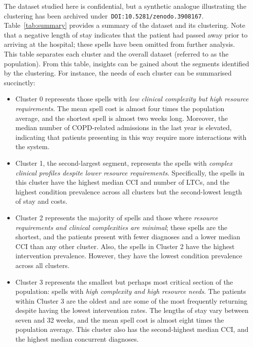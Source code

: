 \documentclass[]{interact}
\theoremstyle{plain}%
\theoremstyle{definition}
\theoremstyle{remark}
\begin{document}
\begin{table}
    \centering
    \resizebox{\textwidth}{!}{}
    \caption{%
        A summary of clinical and condition-specific characteristics for each
        cluster and the population
    }
    \label{tab:summary}
\end{table}

The dataset studied here is confidential, but a synthetic analogue illustrating
the clustering has been archived under~\texttt{DOI:10.5281/zenodo.3908167}.
Table~\ref{tab:summary} provides a summary of the dataset and its clustering.
Note that a negative length of stay indicates that the patient had passed away
prior to arriving at the hospital; these spells have been omitted from further
analysis. This table separates each cluster and the overall dataset (referred to
as the population). From this table, insights can be gained about the segments
identified by the clustering. For instance, the needs of each cluster can be
summarised succinctly:

\begin{itemize}
    \item Cluster 0 represents those spells with {\slshape low clinical
        complexity but high resource requirements}. The mean spell cost is
        almost four times the population average, and the shortest spell is
        almost two weeks long. Moreover, the median number of COPD-related
        admissions in the last year is elevated, indicating that patients
        presenting in this way require more interactions with the system.
    \item Cluster 1, the second-largest segment, represents the spells with
        {\slshape complex clinical profiles despite lower resource
        requirements}. Specifically, the spells in this cluster have the highest
        median CCI and number of LTCs, and the highest condition prevalence
        across all clusters but the second-lowest length of stay and costs.
    \item Cluster 2 represents the majority of spells and those where {\slshape
        resource requirements and clinical complexities are minimal}; these
        spells are the shortest, and the patients present with fewer diagnoses
        and a lower median CCI than any other cluster. Also, the spells in
        Cluster 2 have the highest intervention prevalence. However, they have
        the lowest condition prevalence across all clusters.
    \item Cluster 3 represents the smallest but perhaps most critical section of
        the population: spells with {\slshape high complexity and high resource
        needs}. The patients within Cluster 3 are the oldest and are some of the
        most frequently returning despite having the lowest intervention rates.
        The lengths of stay vary between seven and 32 weeks, and the mean spell
        cost is almost eight times the population average. This cluster also has
        the second-highest median CCI, and the highest median concurrent
        diagnoses.
\end{itemize}
\end{document}
